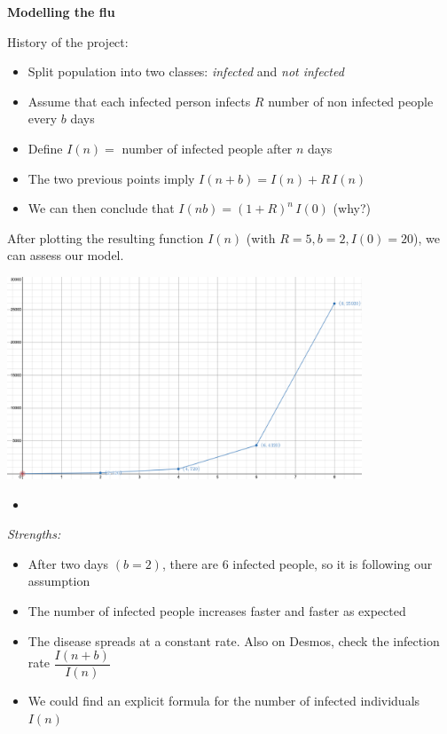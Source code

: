 \begin{example}\textbf{Modelling the flu}

History of the project:
\begin{itemize}
	\item Split population into two classes: \emph{infected} and \emph{not infected}
	\item Assume that each infected person infects $R$ number of non infected people every $b$ days
	\item Define $I(n) = $ number of infected people after $n$ days
	\item The two previous points imply \quad $I(n + b) = I(n) + R \, I(n)$
	\item We can then conclude that \quad $I(n b) = (1+R)^n \, I(0)$ \hfill (why?) \\
\end{itemize}

After plotting the resulting function $I(n)$ (with $R=5, b=2, I(0)=20$), we can assess our model.
\begin{center}
	\includegraphics*[width=300pt]{images/module5-graph.png}	
\end{center}
\begin{itemize}
	\item {}
\end{itemize}


\emph{Strengths:}
\begin{itemize}
	\item After two days $(b=2)$, there are 6 infected people, so it is following our assumption
	\item The number of infected people increases faster and faster as expected 
	\item The disease spreads at a constant rate. Also on Desmos, check the infection rate $\dfrac{I(n+b)}{I(n)}$
	\item We could find an explicit formula for the number of infected individuals $I(n)$ \\
\end{itemize}



\end{example}
